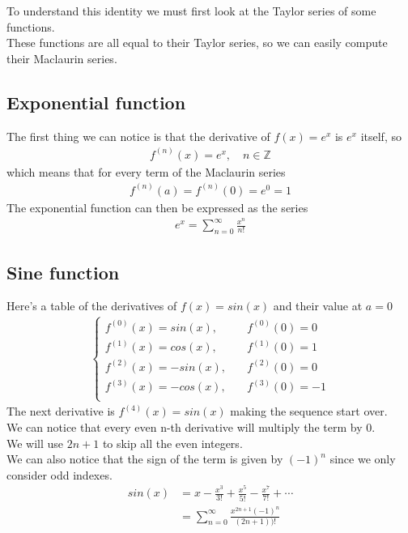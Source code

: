 \documentclass{article}
\begin{document}
To understand this identity we must first look at the Taylor series of some functions.
\\
These functions are all equal to their Taylor series, so we can easily compute their Maclaurin series.

\subsection{Exponential function}

The first thing we can notice is that the derivative of \(f(x)=e^x\) is \(e^x\) itself, so
\begin{align*}
    f^{(n)}(x)=e^x,
    \quad n\in\mathds{Z}
\end{align*}
which means that for every term of the Maclaurin series
\begin{align*}
    f^{(n)}(a)=f^{(n)}(0)=e^0=1
\end{align*}
The exponential function can then be expressed as the series
\begin{align*}
    e^x=\sum_{n=0}^{\infty}\frac{x^n}{n!}
\end{align*}

\pagebreak

\subsection{Sine function}

Here's a table of the derivatives of \(f(x)=sin(x)\) and their value at \(a=0\)
\begin{align*}
    \begin{cases}
        f^{(0)}(x)=sin(x), \quad &f^{(0)}(0)=0 \\
        f^{(1)}(x)=cos(x), \quad &f^{(1)}(0)=1 \\
        f^{(2)}(x)=-sin(x),\quad &f^{(2)}(0)=0 \\
        f^{(3)}(x)=-cos(x),\quad &f^{(3)}(0)=-1\\
    \end{cases}
\end{align*}
The next derivative is \(f^{(4)}(x)=sin(x)\) making the sequence start over.
\\
We can notice that every even n-th derivative will multiply the term by \(0\).
\\
We will use \(2n+1\) to skip all the even integers.
\\
We can also notice that the sign of the term is given by \((-1)^n\) since we only consider odd indexes.
\begin{align*}
    sin(x)&=x-\frac{x^3}{3!}+\frac{x^5}{5!}-\frac{x^7}{7!}+\cdots
    \\
    &=\sum_{n=0}^{\infty}\frac{x^{2n+1}(-1)^n}{(2n+1))!}
\end{align*}
\end{document}
